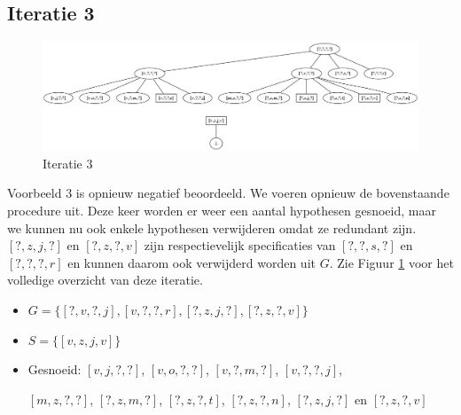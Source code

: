 \documentclass[alternative-exam.tex]{subfiles}
\begin{document}
\subsection{Iteratie 3}
\begin{figure}
\centering
\caption{Iteratie 3}
\label{iter_3}
\includegraphics[scale=0.35]{resources/graphs/iteration_3.png}
\end{figure}
Voorbeeld $3$ is opnieuw negatief beoordeeld. We voeren opnieuw de bovenstaande procedure uit. Deze keer worden er weer een aantal hypothesen gesnoeid, maar we kunnen nu ook enkele hypothesen verwijderen omdat ze redundant zijn. $[?,z,j,?]$ en $[?,z,?,v]$ zijn respectievelijk specificaties van $[?,?,s,?]$ en $[?,?,?,r]$ en kunnen daarom ook verwijderd worden uit $G$. Zie Figuur \ref{iter_3} voor het volledige overzicht van deze iteratie.
\begin{itemize}
\item $G = \{[?,v,?,j],[v,?,?,r],[?,z,j,?],[?,z,?,v]\}$
\item $S = \{[v,z,j,v]\}$
\item Gesnoeid: $[v,j,?,?]$, $[v,o,?,?]$, $[v,?,m,?]$, $[v,?,?,j]$,

$[m,z,?,?]$, $[?,z,m,?]$, $[?,z,?,t]$, $[?,z,?,n]$,  $[?,z,j,?]$ en $[?,z,?,v]$
\end{itemize}
\end{document}
